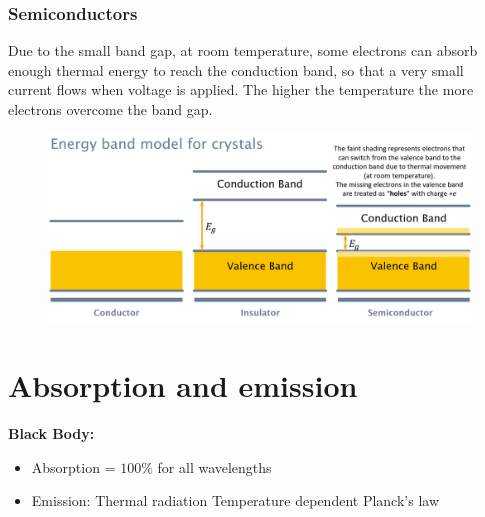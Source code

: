 \subsubsection{Semiconductors}
Due to the small band gap, at room temperature, some electrons can absorb enough thermal energy to reach the conduction band, so that a very small current flows when voltage is applied.
The higher the temperature the more electrons overcome the band gap.
\begin{figure}[h]
    \centering
    \includegraphics[width=\columnwidth]{images/bandmodel2.png}
    \label{fig:bandmodel2}
\end{figure}
\section{Absorption and emission}
\textbf{Black Body:}
\begin{itemize}
    \item Absorption = \(100\%\) for all wavelengths
    \item Emission:
    \subitem Thermal radiation
    \subitem Temperature dependent
    \subitem Planck's law 
\end{itemize}

